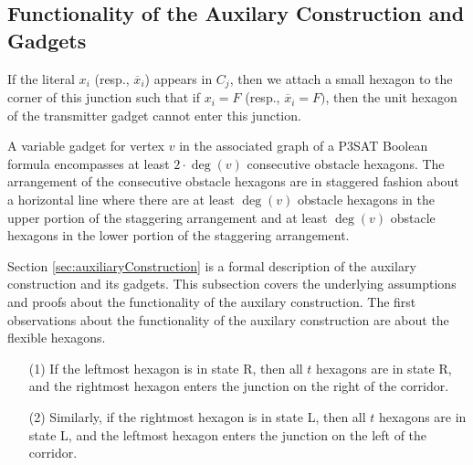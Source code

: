 \subsection{Functionality of the Auxilary Construction and Gadgets}

If the literal $x_i$ (resp., $\overline{x}_i$) appears in $C_j$, then we attach a small hexagon to the corner of this junction such that if $x_i=F$ (resp., $\overline{x}_i=F)$, then the unit hexagon of the transmitter gadget cannot enter this junction. 

A variable gadget for vertex $v$ in the associated graph of a P3SAT Boolean formula encompasses at least $2 \cdot \deg (v)$ consecutive obstacle hexagons. 
The arrangement of the consecutive obstacle hexagons are in staggered fashion about a horizontal line where there are at least $\deg (v)$ obstacle hexagons in the upper portion of the staggering arrangement and at least $\deg (v)$ obstacle hexagons in the lower portion of the staggering arrangement.

Section \ref{sec:auxiliaryConstruction} is a formal description of the auxilary construction and its gadgets.
This subsection covers the underlying assumptions and proofs about the functionality of the auxilary construction.
The first observations about the functionality of the auxilary construction are about the flexible hexagons.
\begin{observation}\label{obs:corridor}

\begin{itemize}

\item[(1)] If the leftmost hexagon is in state R, then all $t$ hexagons are in state R, and the rightmost hexagon enters the junction on the right of the corridor.
\item[(2)] Similarly, if the rightmost hexagon is in state L, then all $t$ hexagons are in state L, and the leftmost hexagon enters the junction on the left of the corridor.
\end{itemize}
\end{observation}


